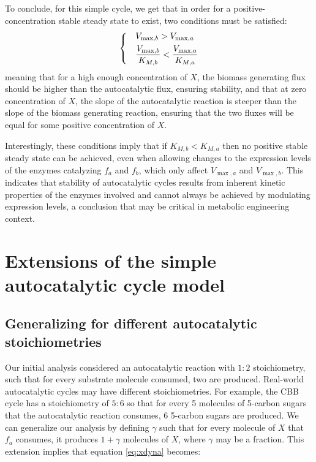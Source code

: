 \documentclass[a4page,notitlepage]{article}
\begin{document}
    To conclude, for this simple cycle, we get that in order for a positive-concentration stable steady state to exist, two conditions must be satisfied:
    \begin{equation}
    \label{eq:stabconds}
    \begin{dcases}
      & V_{\max,b}>V_{\max,a} \\
      & \frac{V_{\max,b}}{K_{M,b}}<\frac{V_{\max,a}}{K_{M,a}}
    \end{dcases}
    \end{equation}
    meaning that for a high enough concentration of $X$, the biomass generating flux should be higher than the autocatalytic flux, ensuring stability, and that at zero concentration of $X$, the slope of the autocatalytic reaction is steeper than the slope of the biomass generating reaction, ensuring that the two fluxes will be equal for some positive concentration of $X$.

    Interestingly, these conditions imply that if $K_{M,b}<K_{M,a}$ then no positive stable steady state can be achieved, even when allowing changes to the expression levels of the enzymes catalyzing $f_a$ and $f_b$, which only affect $V_{\max,a}$ and $V_{\max,b}$.
    This indicates that stability of autocatalytic cycles results from inherent kinetic properties of the enzymes involved and cannot always be achieved by modulating expression levels, a conclusion that may be critical in metabolic engineering context.
\section{Extensions of the simple autocatalytic cycle model}
    \subsection{Generalizing for different autocatalytic stoichiometries}
    Our initial analysis considered an autocatalytic reaction with $1:2$ stoichiometry, such that for every substrate molecule consumed, two are produced.
    Real-world autocatalytic cycles may have different stoichiometries.
    For example, the CBB cycle has a stoichiometry of $5:6$ so that for every 5 molecules of 5-carbon sugars that the autocatalytic reaction consumes, 6 5-carbon sugars are produced.
    We can generalize our analysis by defining $\gamma$ such that for every molecule of $X$ that $f_a$ consumes, it produces $1+\gamma$ molecules of $X$, where $\gamma$ may be a fraction.
    This extension implies that equation \eqref{eq:xdyna} becomes:
\end{document}
